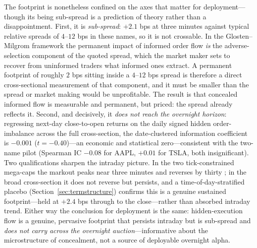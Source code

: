 \documentclass[11pt]{article}
\begin{document}
The footprint is nonetheless confined on the axes that matter for deployment---though its being sub-spread is a prediction of theory rather than a disappointment. First, it is \emph{sub-spread}: $+2.1$ bps at three minutes against typical relative spreads of $4$--$12$ bps in these names, so it is not crossable. In the Glosten--Milgrom framework the permanent impact of informed order flow \emph{is} the adverse-selection component of the quoted spread, which the market maker sets to recover from uninformed traders what informed ones extract. A permanent footprint of roughly $2$ bps sitting inside a $4$--$12$ bps spread is therefore a direct cross-sectional measurement of that component, and it must be smaller than the spread or market making would be unprofitable. The result is that concealed informed flow is measurable and permanent, but priced: the spread already reflects it. Second, and decisively, it \emph{does not reach the overnight horizon}: regressing next-day close-to-open returns on the daily signed hidden order-imbalance across the full cross-section, the date-clustered information coefficient is $-0.001$ ($t=-0.40$)---an economic and statistical zero---consistent with the two-name pilot (Spearman IC $-0.08$ for AAPL, $+0.01$ for TSLA, both insignificant). Two qualifications sharpen the intraday picture. In the two tick-constrained mega-caps the markout peaks near three minutes and reverses by thirty ; in the broad cross-section it does not reverse but persists, and a time-of-day-stratified placebo (Section~\ref{sec:termstructure}) confirms this is a genuine sustained footprint---held at $+2.4$ bps through to the close---rather than absorbed intraday trend. Either way the conclusion for deployment is the same: hidden-execution flow is a genuine, pervasive footprint that persists intraday but is sub-spread and \emph{does not carry across the overnight auction}---informative about the microstructure of concealment, not a source of deployable overnight alpha.
\end{document}
